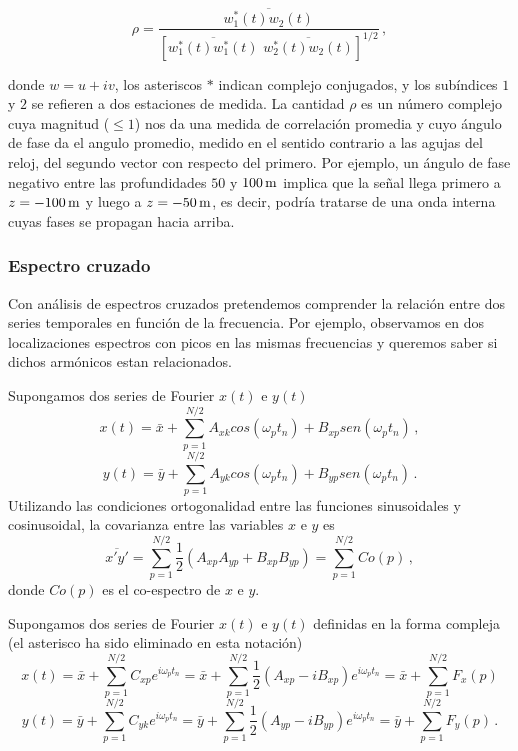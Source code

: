 \documentclass[
]{agujournal2019}
\begin{document}
\[\rho=\frac{\overline{w_1^*(t)w_2(t)}}
{\left[ \overline{w_1^*(t)w_1^*(t)}\,\, \overline{w_2^*(t)w_2(t)} \right]^{1/2}}\,,\]

donde \(w=u+i v\), los asteriscos \(*\) indican complejo conjugados, y
los subíndices \(1\) y \(2\) se refieren a dos estaciones de medida. La
cantidad \(\rho\) es un número complejo cuya magnitud (\(\le1\)) nos da
una medida de correlación promedia y cuyo ángulo de fase da el angulo
promedio, medido en el sentido contrario a las agujas del reloj, del
segundo vector con respecto del primero. Por ejemplo, un ángulo de fase
negativo entre las profundidades \(50\) y \(100\,{\rm m}\) implica que
la señal llega primero a \(z=-100\,{\rm m}\) y luego a
\(z=-50\,{\rm m}\), es decir, podría tratarse de una onda interna cuyas
fases se propagan hacia arriba.

\vspace{0.5cm}

\hypertarget{espectro-cruzado}{%
\subsubsection{Espectro cruzado}\label{espectro-cruzado}}

Con análisis de espectros cruzados pretendemos comprender la relación
entre dos series temporales en función de la frecuencia. Por ejemplo,
observamos en dos localizaciones espectros con picos en las mismas
frecuencias y queremos saber si dichos armónicos estan relacionados.

Supongamos dos series de Fourier \(x(t)\) e \(y(t)\)
\[x(t)=\bar{x}+\sum\limits^{N/2}_{p=1} A_{xk} cos(\omega_p t_n) + B_{xp}sen(\omega_p t_n)\,,\]
\[y(t)=\bar{y}+\sum\limits^{N/2}_{p=1} A_{yk}cos(\omega_p t_n) + B_{yp}sen(\omega_p t_n)\,.\]
Utilizando las condiciones ortogonalidad entre las funciones
sinusoidales y cosinusoidal, la covarianza entre las variables \(x\) e
\(y\) es
\[\overline{x'y'}=\sum\limits^{N/2}_{p=1} \frac{1}{2}( A_{xp}A_{yp}  + B_{xp}B_{yp})=\sum\limits^{N/2}_{p=1}Co(p)\,,\]
donde \(Co(p)\) es el co-espectro de \(x\) e \(y\).

Supongamos dos series de Fourier \(x(t)\) e \(y(t)\) definidas en la
forma compleja (el asterisco ha sido eliminado en esta notación)
\[x(t)=\bar{x}+\sum\limits^{N/2}_{p=1}
  C_{xp} e^{i\omega_p t_n}=\bar{x}+
  \sum\limits^{N/2}_{p=1}\frac{1}{2}\left(A_{xp} - iB_{xp} \right)e^{i\omega_p t_n}=\bar{x}+
  \sum\limits^{N/2}_{p=1}F_x(p)\] \[y(t)=\bar{y}+\sum\limits^{N/2}_{p=1}
  C_{yk} e^{i\omega_p t_n}=\bar{y}+
  \sum\limits^{N/2}_{p=1}\frac{1}{2}\left(A_{yp} - iB_{yp} \right)e^{i\omega_p t_n}=\bar{y}+
  \sum\limits^{N/2}_{p=1}F_y(p)\,.\]
\end{document}
